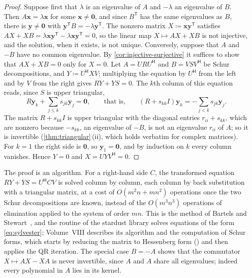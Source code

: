 \begin{proof}
Suppose first that $\lambda$ is an eigenvalue of $A$ and $-\lambda$ an eigenvalue of $B$. Then $A\mathbf x=\lambda\mathbf x$ for some $\mathbf x\ne\mathbf 0$, and since $B^{\mathsf T}$ has the same eigenvalues as $B$, there is $\mathbf y\ne\mathbf 0$ with $\mathbf y^{\mathsf T}B=-\lambda\mathbf y^{\mathsf T}$. The nonzero matrix $X\coloneqq\mathbf x\mathbf y^{\mathsf T}$ satisfies $AX+XB=\lambda\mathbf x\mathbf y^{\mathsf T}-\lambda\mathbf x\mathbf y^{\mathsf T}=0$, so the linear map $X\mapsto AX+XB$ is not injective, and the solution, when it exists, is not unique. Conversely, suppose that $A$ and $-B$ have no common eigenvalue. By \cref{cor:injective-surjective} it suffices to show that $AX+XB=0$ only for $X=0$. Let $A=URU^{\mathsf H}$ and $B=VSV^{\mathsf H}$ be Schur decompositions, and $Y\coloneqq U^{\mathsf H}XV$; multiplying the equation by $U^{\mathsf H}$ from the left and by $V$ from the right gives $RY+YS=0$. The $k$th column of this equation reads, since $S$ is upper triangular,
\[
R\mathbf y_k+\sum_{j\le k}s_{jk}\mathbf y_j=\mathbf 0,\qquad\text{that is,}\qquad(R+s_{kk}I)\mathbf y_k=-\sum_{j<k}s_{jk}\mathbf y_j .
\]
The matrix $R+s_{kk}I$ is upper triangular with the diagonal entries $r_{ii}+s_{kk}$, which are nonzero because $-s_{kk}$, an eigenvalue of $-B$, is not an eigenvalue $r_{ii}$ of $A$; so it is invertible (\cref{thm:triangular}\,(ii), which holds verbatim for complex matrices). For $k=1$ the right side is $\mathbf 0$, so $\mathbf y_1=\mathbf 0$, and by induction on $k$ every column vanishes. Hence $Y=0$ and $X=UYV^{\mathsf H}=0$.
\end{proof}

The proof is an algorithm. For a right-hand side $C$, the transformed equation $RY+YS=U^{\mathsf H}CV$ is solved column by column, each column by back substitution with a triangular matrix, at a cost of $O(m^2n+mn^2)$ operations once the two Schur decompositions are known, instead of the $O(m^3n^3)$ operations of elimination applied to the system of order $mn$. This is the method of Bartels and Stewart~\cite{bartels1972}, and the routine  of the stardust library solves equations of the form \eqref{eq:sylvester}; Volume~VIII describes its algorithm and the computation of Schur forms, which starts by reducing the matrix to Hessenberg form () and then applies the QR iteration. The special case $B=-A$ shows that the commutator $X\mapsto AX-XA$ is never invertible, since $A$ and $A$ share all eigenvalues; indeed every polynomial in $A$ lies in its kernel.

